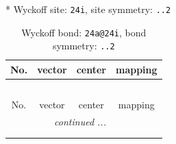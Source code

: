 \documentclass[fleqn,8pt]{jsarticle}
\begin{document}
* Wyckoff site: {\tt 24i}, site symmetry: {\tt ..2}
\renewcommand{\arraystretch}{1.2}
\begin{longtable}{cccc}
\caption{Wyckoff bond: {\tt 24a@24i}, bond symmetry: {\tt ..2}}
 \\
 \hline \hline
No. & vector & center & mapping \\ \hline \endfirsthead

\multicolumn{3}{l}{\tablename\ \thetable{}} \\
 \hline \hline
No. & vector & center & mapping \\ \hline \endhead

 \hline \hline
\multicolumn{3}{r}{\footnotesize\it continued ...} \\ \endfoot

 \hline \hline
\multicolumn{3}{r}{} \\ \endlastfoot


\end{longtable}
\end{document}
